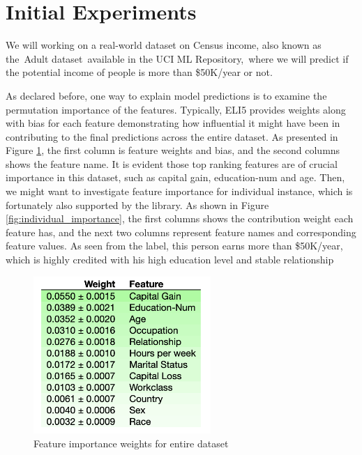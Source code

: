 \documentclass[runningheads]{llncs}
\begin{document}
	\section{Initial Experiments}
	
	We will working on a real-world dataset on Census income, also known as the Adult dataset available in the UCI ML Repository, where we will predict if the potential income of people is more than \$50K/year or not.
	
	As declared before, one way to explain model predictions is to examine the permutation importance of the features. Typically, ELI5\cite{eli5} provides weights along with bias for each feature demonstrating how influential it might have been in contributing to the final predictions across the entire dataset. As presented in Figure \ref{fig:feature_weights}, the first column is feature weights and bias, and the second columns shows the feature name. It is evident those top ranking features are of crucial importance in this dataset, such as capital gain, education-num and age. Then, we might want to investigate feature importance for individual instance, which is fortunately also supported by the library. As shown in Figure \ref{fig:individual_importance}, the first columns shows the contribution weight each feature has, and the next two columns represent feature names and corresponding feature values. As seen from the label, this person earns more than \$50K/year, which is  highly credited with his high education level and stable relationship
	
	\begin{figure}
		\centering
		\includegraphics[width=0.6\textwidth]{img/feature_weights.png}
		\caption{Feature importance weights for entire dataset}
		\label{fig:feature_weights}
	\end{figure}
\end{document}
